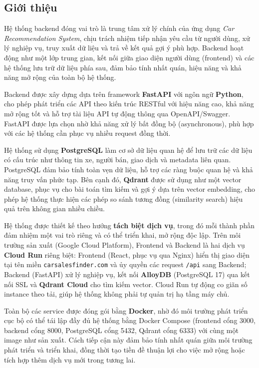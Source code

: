 \subsection{Giới thiệu}

Hệ thống backend đóng vai trò là trung tâm xử lý chính của ứng dụng \textit{Car Recommendation System}, chịu trách nhiệm tiếp nhận yêu cầu từ người dùng, xử lý nghiệp vụ, truy xuất dữ liệu và trả về kết quả gợi ý phù hợp. Backend hoạt động như một lớp trung gian, kết nối giữa giao diện người dùng (frontend) và các hệ thống lưu trữ dữ liệu phía sau, đảm bảo tính nhất quán, hiệu năng và khả năng mở rộng của toàn bộ hệ thống.

Backend được xây dựng dựa trên framework \textbf{FastAPI} với ngôn ngữ \textbf{Python}, cho phép phát triển các API theo kiến trúc RESTful với hiệu năng cao, khả năng mở rộng tốt và hỗ trợ tài liệu API tự động thông qua OpenAPI/Swagger. FastAPI được lựa chọn nhờ khả năng xử lý bất đồng bộ (asynchronous), phù hợp với các hệ thống cần phục vụ nhiều request đồng thời.

Hệ thống sử dụng \textbf{PostgreSQL} làm cơ sở dữ liệu quan hệ để lưu trữ các dữ liệu có cấu trúc như thông tin xe, người bán, giao dịch và metadata liên quan. PostgreSQL đảm bảo tính toàn vẹn dữ liệu, hỗ trợ các ràng buộc quan hệ và khả năng truy vấn phức tạp. Bên cạnh đó, \textbf{Qdrant} được sử dụng như một vector database, phục vụ cho bài toán tìm kiếm và gợi ý dựa trên vector embedding, cho phép hệ thống thực hiện các phép so sánh tương đồng (similarity search) hiệu quả trên không gian nhiều chiều.

Hệ thống được thiết kế theo hướng \textbf{tách biệt dịch vụ}, trong đó mỗi thành phần đảm nhiệm một vai trò riêng và có thể triển khai, mở rộng độc lập. Trên môi trường sản xuất (Google Cloud Platform), Frontend và Backend là hai dịch vụ \textbf{Cloud Run} riêng biệt: Frontend (React, phục vụ qua Nginx) hiển thị giao diện tại tên miền \texttt{carsalesfinder.com} và ủy quyền các request \texttt{/api} sang Backend; Backend (FastAPI) xử lý nghiệp vụ, kết nối \textbf{AlloyDB} (PostgreSQL 17) qua kết nối SSL và \textbf{Qdrant Cloud} cho tìm kiếm vector. Cloud Run tự động co giãn số instance theo tải, giúp hệ thống không phải tự quản trị hạ tầng máy chủ.

Toàn bộ các service được đóng gói bằng \textbf{Docker}, nhờ đó môi trường phát triển cục bộ có thể tái lập đầy đủ hệ thống bằng Docker Compose (frontend cổng 3000, backend cổng 8000, PostgreSQL cổng 5432, Qdrant cổng 6333) với cùng một image như sản xuất. Cách tiếp cận này đảm bảo tính nhất quán giữa môi trường phát triển và triển khai, đồng thời tạo tiền đề thuận lợi cho việc mở rộng hoặc tích hợp thêm dịch vụ mới trong tương lai.

